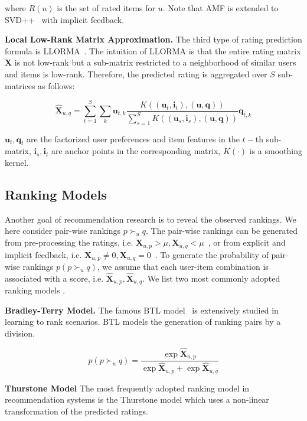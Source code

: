 \documentclass[letterpaper]{article} %
\newcommand{\Rating}{\mathbf{X}}
\begin{document}
where  $R(u)$ is the set of rated items for $u$. Note that AMF is extended to SVD++~\cite{Koren2008Factorization} with implicit feedback. 

\textbf{Local Low-Rank Matrix Approximation.} The third type of rating prediction formula is  LLORMA~\cite{Lee2013Local}. The intuition of LLORMA is that the entire rating matrix $\Rating$ is not low-rank but a sub-matrix restricted to a neighborhood of similar users and items is low-rank.  Therefore, the predicted rating is aggregated over $S$ sub-matrices  as follows:

\begin{equation}\label{equ:LLORMA}
\hat{\Rating}_{u,q} = \sum_{t=1}^{S} \sum_k \mathbf{u}_{t, k} \frac{K((\mathbf{u}_t,\mathbf{i}_t),(\mathbf{u},\mathbf{q}))}{\sum_{s=1}^{S} K((\mathbf{u}_s,\mathbf{i}_s),(\mathbf{u},\mathbf{q}))} \mathbf{q}_{t,k}
\end{equation}

$\mathbf{u}_t, \mathbf{q}_t$ are the factorized user preferences and item features in the $t-$th sub-matrix,  $\mathbf{i}_s,\mathbf{i}_t$ are anchor points in the corresponding matrix, $K(\cdot)$ is a smoothing kernel. 


\subsection{Ranking Models}
Another goal of recommendation research is to reveal the observed rankings. We here consider pair-wise rankings $p\succ_u q$. The pair-wise rankings can be generated from pre-processing  the ratings, i.e. $\Rating_{u,p}> \mu, \Rating_{u,q}<\mu$~\cite{}, or from explicit and implicit feedback, i.e. $\Rating_{u,p}\neq 0, \Rating_{u,q}=0$~\cite{Rendle2009BPR}. To generate the probability of pair-wise rankings $p(p\succ_u q)$, we assume that each user-item combination is associated with a score, i.e. $\hat{\Rating}_{u,p},\hat{\Rating}_{u,q}$.  We list two most commonly adopted ranking models . 

\textbf{Bradley-Terry Model.} The famous BTL model~\cite{Hunter2004MM} is extensively studied in learning to rank scenarios. BTL models the generation of ranking pairs by a division.

\begin{equation}\label{equ:BTL}
p(p\succ_u q) = \frac{\exp{\hat{\Rating}_{u,p}}}{\exp{\hat{\Rating}_{u,p}}+ \exp{\hat{\Rating}_{u,q}}} 
\end{equation}


\textbf{Thurstone Model} The most frequently adopted ranking model in recommendation systems is the Thurstone model which uses a non-linear transformation of the predicted ratings. 
\end{document}
